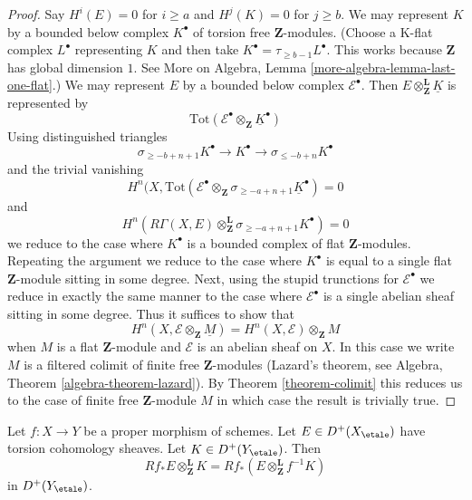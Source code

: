 \begin{proof}
Say $H^i(E) = 0$ for $i \geq a$ and $H^j(K) = 0$ for $j \geq b$.
We may represent $K$ by a bounded below complex
$K^\bullet$ of torsion free $\mathbf{Z}$-modules.
(Choose a K-flat complex $L^\bullet$ representing $K$ and then
take $K^\bullet = \tau_{\geq b - 1}L^\bullet$. This works because
$\mathbf{Z}$ has global dimension $1$. See
More on Algebra, Lemma \ref{more-algebra-lemma-last-one-flat}.)
We may represent $E$ by a bounded below complex
$\mathcal{E}^\bullet$.
Then $E \otimes_\mathbf{Z}^\mathbf{L} \underline{K}$ is
represented by
$$
\text{Tot}(\mathcal{E}^\bullet \otimes_\mathbf{Z} \underline{K}^\bullet)
$$
Using distinguished triangles
$$
\sigma_{\geq -b + n + 1}K^\bullet
\to K^\bullet \to
\sigma_{\leq -b + n}K^\bullet
$$
and the trivial vanishing
$$
H^n(X,
\text{Tot}(\mathcal{E}^\bullet \otimes_\mathbf{Z}
\sigma_{\geq -a + n + 1}\underline{K}^\bullet) = 0
$$
and
$$
H^n(R\Gamma(X, E)
\otimes_\mathbf{Z}^\mathbf{L} \sigma_{\geq -a + n + 1}K^\bullet) = 0
$$
we reduce to the case where $K^\bullet$ is a bounded complex of
flat $\mathbf{Z}$-modules. Repeating the argument we reduce to the
case where $K^\bullet$ is equal to a single flat $\mathbf{Z}$-module
sitting in some degree. Next, using the stupid
trunctions for $\mathcal{E}^\bullet$
we reduce in exactly the same manner to the case where
$\mathcal{E}^\bullet$ is a single abelian sheaf sitting
in some degree. Thus it suffices to show that
$$
H^n(X, \mathcal{E} \otimes_\mathbf{Z} \underline{M}) =
H^n(X, \mathcal{E}) \otimes_\mathbf{Z} M
$$
when $M$ is a flat $\mathbf{Z}$-module and $\mathcal{E}$
is an abelian sheaf on $X$. In this case we
write $M$ is a filtered colimit of finite free $\mathbf{Z}$-modules
(Lazard's theorem, see Algebra, Theorem \ref{algebra-theorem-lazard}).
By Theorem \ref{theorem-colimit} this reduces us to the case of finite free
$\mathbf{Z}$-module $M$ in which case the result is trivially true.
\end{proof}

\begin{lemma}
\label{lemma-projection-formula-proper}
Let $f : X \to Y$ be a proper morphism of schemes.
Let $E \in D^+(X_\etale)$ have torsion cohomology sheaves.
Let $K \in D^+(Y_\etale)$. Then
$$
Rf_*E \otimes_\mathbf{Z}^\mathbf{L} K =
Rf_*(E \otimes_\mathbf{Z}^\mathbf{L} f^{-1}K)
$$
in $D^+(Y_\etale)$.
\end{lemma}


